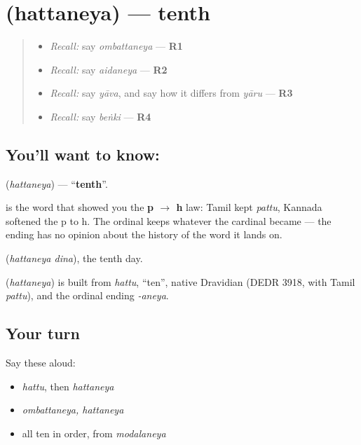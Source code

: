 \section[\texorpdfstring{\kn{ಹತ್ತನೆಯ} (hattaneya)}{ಹತ್ತನೆಯ (hattaneya)}]{ (hattaneya) — tenth}

\label{lesson:KA-C75-tenth}



\begin{quote}
\begin{itemize}
\raggedright
  \item \emph{Recall:} say \emph{ombattaneya} — \textbf{R1}
  \item \emph{Recall:} say \emph{aidaneya} — \textbf{R2}
  \item \emph{Recall:} say \emph{yāva}, and say how it differs from \emph{yāru} — \textbf{R3}
  \item \emph{Recall:} say \emph{beṅki} — \textbf{R4}
\end{itemize}
\end{quote}

\subsection*{You'll want to know: }
\textbf{} (\emph{hattaneya}) — \textquotedblleft{}\textbf{tenth}\textquotedblright{}.

\textbf{} is the word that showed you the \textbf{p $\to$ h} law: Tamil kept \emph{pattu}, Kannada softened the p to h. The ordinal keeps whatever the cardinal became — the ending has no opinion about the history of the word it lands on.

\textbf{ } (\emph{hattaneya dina}), the tenth day.

\begin{cousinweb}
\textbf{} (\emph{hattaneya}) is built from \emph{hattu}, \textquotedblleft{}ten\textquotedblright{}, native Dravidian (DEDR 3918, with Tamil \emph{pattu}), and the ordinal ending \emph{-aneya}.
\end{cousinweb}

\subsection*{Your turn}
Say these aloud:

\begin{itemize}
\raggedright
  \item \emph{hattu}, then \emph{hattaneya}
  \item \emph{ombattaneya, hattaneya}
  \item all ten in order, from \emph{modalaneya}
\end{itemize}

